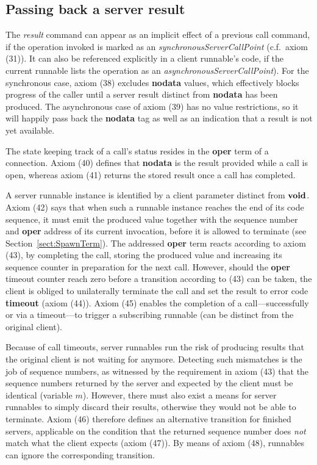 \documentclass[twocolumn]{article}
\begin{document}
\subsection{Passing back a server result} \label{sect:Res}

The \emph{result} command can appear as an implicit effect of a previous call command, if the operation invoked is marked as an \emph{synchronousServerCallPoint} (c.f.\ axiom (31)). It can also be referenced explicitly in a client runnable's code, if the current runnable lists the operation as an \emph{asynchronousServerCallPoint}). For the synchronous case, axiom (38) excludes \textbf{nodata} values, which effectively blocks progress of the caller until a server result distinct from \textbf{nodata} has been produced. The asynchronous case of axiom (39) has no value restrictions, so it will happily pass back the \textbf{nodata} tag as well as an indication that a result is not yet available.

The state keeping track of a call's status resides in the \textbf{oper} term of a connection. Axiom (40) defines that \textbf{nodata} is the result provided while a call is open, whereas axiom (41) returns the stored result once a call has completed.

A server runnable instance is identified by a client parameter distinct from $\textbf{void}$. Axiom (42) says that when such a runnable instance reaches the end of its code sequence, it must emit the produced value together with the sequence number and \textbf{oper} address of its current invocation, before it is allowed to terminate (see Section~\ref{sect:SpawnTerm}). The addressed \textbf{oper} term reacts according to axiom (43), by completing the call, storing the produced value and increasing its sequence counter in preparation for the next call. However, should the \textbf{oper} timeout counter reach zero before a transition according to (43) can be taken, the client is obliged to unilaterally terminate the call and set the result to error code \textbf{timeout} (axiom (44)). Axiom (45) enables the completion of a call---successfully or via a timeout---to trigger a subscribing runnable (can be distinct from the original client).

Because of call timeouts, server runnables run the risk of producing results that the original client is not waiting for anymore. Detecting such mismatches is the job of sequence numbers, as witnessed by the requirement in axiom (43) that the sequence numbers returned by the server and expected by the client must be identical (variable $m$). However, there must also exist a means for server runnables to simply discard their results, otherwise they would not be able to terminate. Axiom (46) therefore defines an alternative transition for finished servers, applicable on the condition that the returned sequence number does \emph{not} match what the client expects (axiom (47)). By means of axiom (48), runnables can ignore the corresponding transition.
\end{document}
